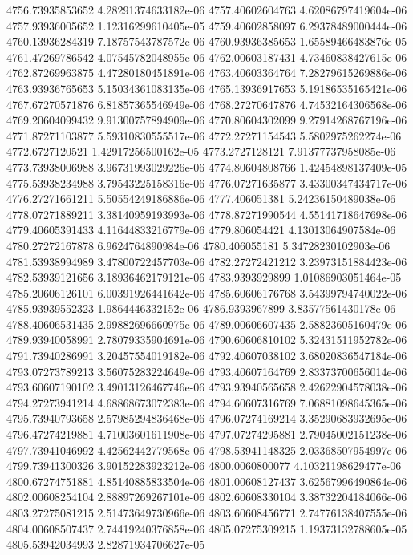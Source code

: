 {4756.73935853652 4.28291374633182e-06
4757.40602604763 4.62086797419604e-06
4757.93936005652 1.12316299610405e-05
4759.40602858097 6.29378489000444e-06
4760.13936284319 7.18757543787572e-06
4760.93936385653 1.65589466483876e-05
4761.47269786542 4.07545782048955e-06
4762.00603187431 4.73460838427615e-06
4762.87269963875 4.47280180451891e-06
4763.40603364764 7.28279615269886e-06
4763.93936765653 5.15034361083135e-06
4765.13936917653 5.19186535165421e-06
4767.67270571876 6.81857365546949e-06
4768.27270647876 4.74532164306568e-06
4769.20604099432 9.91300757894909e-06
4770.80604302099 9.27914268767196e-06
4771.87271103877 5.59310830555517e-06
4772.27271154543 5.5802975262274e-06
4772.6727120521 1.42917256500162e-05
4773.2727128121 7.91377737958085e-06
4773.73938006988 3.96731993029226e-06
4774.80604808766 1.42454898137409e-05
4775.53938234988 3.79543225158316e-06
4776.07271635877 3.43300347434717e-06
4776.27271661211 5.50554249186886e-06
4777.406051381 5.24236150489038e-06
4778.07271889211 3.38140959193993e-06
4778.87271990544 4.55141718647698e-06
4779.40605391433 4.11644833216779e-06
4779.806054421 4.13013064907584e-06
4780.27272167878 6.9624764890984e-06
4780.406055181 5.34728230102903e-06
4781.53938994989 3.47800722457703e-06
4782.27272421212 3.23973151884423e-06
4782.53939121656 3.18936462179121e-06
4783.9393929899 1.01086903051464e-05
4785.20606126101 6.00391926441642e-06
4785.60606176768 3.54399794740022e-06
4785.93939552323 1.9864446332152e-06
4786.9393967899 3.83577561430178e-06
4788.40606531435 2.99882696660975e-06
4789.00606607435 2.58823605160479e-06
4789.93940058991 2.78079335904691e-06
4790.60606810102 5.32431511952782e-06
4791.73940286991 3.20457554019182e-06
4792.40607038102 3.68020836547184e-06
4793.07273789213 3.56075283224649e-06
4793.40607164769 2.83373700656014e-06
4793.60607190102 3.49013126467746e-06
4793.93940565658 2.42622904578038e-06
4794.27273941214 4.68868673072383e-06
4794.60607316769 7.06881098645365e-06
4795.73940793658 2.57985294836468e-06
4796.07274169214 3.35290683932695e-06
4796.47274219881 4.71003601611908e-06
4797.07274295881 2.79045002151238e-06
4797.73941046992 4.42562442779568e-06
4798.53941148325 2.03368507954997e-06
4799.73941300326 3.90152283923212e-06
4800.0060800077 4.10321198629477e-06
4800.67274751881 4.85140885833504e-06
4801.00608127437 3.62567996490864e-06
4802.00608254104 2.88897269267101e-06
4802.60608330104 3.38732204184066e-06
4803.27275081215 2.51473649730966e-06
4803.60608456771 2.74776138407555e-06
4804.00608507437 2.74419240376858e-06
4805.07275309215 1.19373132788605e-05
4805.53942034993 2.82871934706627e-05
}
